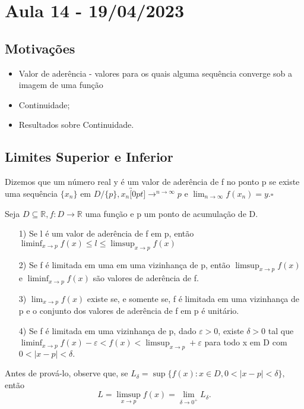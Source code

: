 \documentclass[Analysis/analysis_notes.tex]{subfiles}
\begin{document}
\section{Aula 14 - 19/04/2023}
\subsection{Motiva\c c\~oes}
\begin{itemize}
	\item Valor de ader\^encia - valores para os quais alguma sequ\^encia converge sob a imagem de uma fun\c c\~ao
	\item Continuidade;
	\item Resultados sobre Continuidade.
\end{itemize}
\subsection{Limites Superior e Inferior}
\begin{def*}
	Dizemos que um n\'umero real y \'e um valor de ader\^encia de f no ponto p se existe uma sequ\^encia $\{x_{n}\}$
	em $D/\{p\}, x_{n}\overbracket[0pt]{\longrightarrow}^{n\to \infty}p$ e $\lim_{n\to\infty}f(x_{n}) = y.\square$
\end{def*}
\begin{theorem*}
	Seja $D\subseteq{\mathbb{R}}, f:D\rightarrow \mathbb{R}$ uma fun\c c\~ao e p um ponto de acumula\c c\~ao de D.
	\begin{itemize}
		\item[1)] Se l \'e um valor de ader\^encia de f em p, ent\~ao $\liminf_{x\to p}f(x) \leq{l}\leq{\limsup_{x\to p}f(x)}$
		\item[2)] Se f \'e limitada em uma em uma vizinhan\c ca de p, ent\~ao $\limsup_{x\to p}f(x)$ e
		      $\liminf_{x\to p}f(x)$ s\~ao valores de ader\^encia de f.
		\item[3)] $\lim_{x\to p}f(x)$ existe se, e somente se, f \'e limitada em uma vizinhan\c ca de p e o conjunto dos
		      valores de ader\^encia de f em p \'e unit\'ario.
		\item[4)] Se f \'e limitada em uma vizinhan\c ca de p, dado $\varepsilon > 0$, existe $\delta > 0$ tal que
		      $\liminf_{x\to p}f(x) - \varepsilon < f(x) < \limsup_{x\to p} + \varepsilon$ para todo x em D com $0<|x-p|<\delta.$
	\end{itemize}
\end{theorem*}
Antes de prov\'a-lo, observe que, se $L_{\delta} = \sup\{f(x):x\in D, 0 < |x-p| < \delta\},$ ent\~ao
$$
	L = \limsup_{x\to p}f(x) = \lim_{\delta\to 0^{+}}L_{\delta}.
$$
\end{document}
